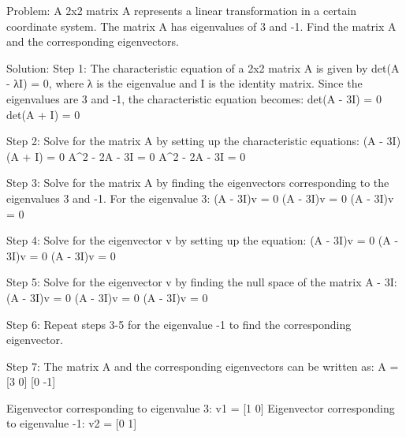 Problem: A 2x2 matrix A represents a linear transformation in a certain coordinate system. The matrix A has eigenvalues of 3 and -1. Find the matrix A and the corresponding eigenvectors.

Solution:
Step 1: The characteristic equation of a 2x2 matrix A is given by det(A - λI) = 0, where λ is the eigenvalue and I is the identity matrix. Since the eigenvalues are 3 and -1, the characteristic equation becomes:
det(A - 3I) = 0
det(A + I) = 0

Step 2: Solve for the matrix A by setting up the characteristic equations:
(A - 3I)(A + I) = 0
A^2 - 2A - 3I = 0
A^2 - 2A - 3I = 0

Step 3: Solve for the matrix A by finding the eigenvectors corresponding to the eigenvalues 3 and -1. For the eigenvalue 3:
(A - 3I)v = 0
(A - 3I)v = 0
(A - 3I)v = 0

Step 4: Solve for the eigenvector v by setting up the equation:
(A - 3I)v = 0
(A - 3I)v = 0
(A - 3I)v = 0

Step 5: Solve for the eigenvector v by finding the null space of the matrix A - 3I:
(A - 3I)v = 0
(A - 3I)v = 0
(A - 3I)v = 0

Step 6: Repeat steps 3-5 for the eigenvalue -1 to find the corresponding eigenvector.

Step 7: The matrix A and the corresponding eigenvectors can be written as:
A = [3 0]
    [0 -1]

Eigenvector corresponding to eigenvalue 3: v1 = [1 0]
Eigenvector corresponding to eigenvalue -1: v2 = [0 1]
